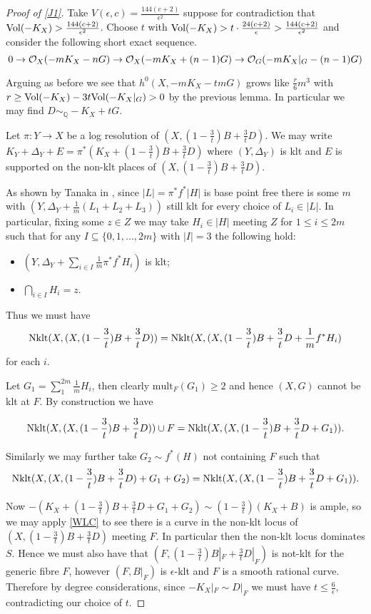 \begin{proof}[Proof of \autoref{J1}]
	
	Take $V(\epsilon,c)=\frac{144(c+2)}{\epsilon^{2}}$ suppose for contradiction that $ \text{Vol}(-K_{X}) > \frac{144(c+2)}{\epsilon^{2}}$. Choose $t$ with $\text{Vol}(-K_{X})> t\cdot\frac{24(c+2)}{\epsilon} > \frac{144(c+2)}{\epsilon^{2}}$ and consider the following short exact sequence.
	\[0 \to \mathcal{O}_{X}(-mK_{X}-nG)\to \mathcal{O}_{X}(-mK_{X}+(n-1)G)\to \mathcal{O}_{G}(-mK_{X}|_{G}-(n-1)G)\]
	
	Arguing as before we see that $h^{0}(X,-mK_{X}-tmG)$ grows like $\frac{r}{6}m^{3}$ with $r\geq \text{Vol}(-K_{X})-3t\text{Vol}(-K_{X}|_{G}) >0$ by the previous lemma. In particular we may find $D \sim_{\mathbb{Q}} -K_{X}+tG$.
	
	Let $\pi\colon Y \to X$ be a log resolution of $(X, (1-\frac{3}{t})B+\frac{3}{t}D)$. We may write $K_{Y}+\Delta_{Y}+E=\pi^{*}(K_{X}+(1-\frac{3}{t})B+\frac{3}{t}D)$ where $(Y,\Delta_{Y})$ is klt and $E$ is supported on the non-klt places of $(X, (1-\frac{3}{t})B+\frac{3}{t}D)$. 
	
	As shown by Tanaka in \cite[Theorem 1]{tanaka2017semiample}, since $|L|=\pi^{*}f^{*}|H|$ is base point free there is some $m$ with $(Y,\Delta_{Y}+\frac{1}{m}(L_{1}+L_{2}+L_{3}))$	 still klt for every choice of $L_{i} \in |L|$. In particular, fixing some $z\in Z$ we may take $H_{i} \in |H|$ meeting $Z$ for $1\leq  i \leq 2m$ such that for any $I \subseteq \{0,1,...,2m\}$ with $|I| =3$ the following hold:
	
	\begin{itemize}
		\item $(Y,\Delta_{Y}+\sum_{i \in I}\frac{1}{m}\pi^{*}f^{*}H_{i})$ is klt;
		\item $\bigcap_{i\in I} H_{i}={z}$.
	\end{itemize} 
	
	Thus we must have 
	\[\textup{Nklt}(X, (X, (1-\frac{3}{t})B+\frac{3}{t}D))=\textup{Nklt}(X, (X, (1-\frac{3}{t})B+\frac{3}{t}D+\frac{1}{m}f^{*}H_{i})\]
	for each $i$. 
	
	Let $G_{1} = \sum_{1}^{2m} \frac{1}{m}H_{i}$, then clearly $\text{mult}_{F}(G_{1}) \geq 2$ and hence $(X,G)$ cannot be klt at $F$. By construction we have
	
	\[\textup{Nklt}(X, (X, (1-\frac{3}{t})B+\frac{3}{t}D)) \cup F = \textup{Nklt}(X, (X, (1-\frac{3}{t})B+\frac{3}{t}D+G_{1})).\]
	
	Similarly we may further take $G_{2} \sim f^{*}(H)$ not containing $F$ such that
	\[\textup{Nklt}(X, (X, (1-\frac{3}{t})B+\frac{3}{t}D)+G_{1}+G_{2}) = \textup{Nklt}(X, (X, (1-\frac{3}{t})B+\frac{3}{t}D+G_{1})).\]
	
	Now $-(K_{X}+(1-\frac{3}{t})B+\frac{3}{t}D+G_{1}+G_{2}) \sim (1-\frac{3}{t})(K_{X}+B)$ is ample, so we may apply \autoref{WLC} to see there is a curve in the non-klt locus of $(X,(1-\frac{3}{t})B+\frac{3}{t}D)$ meeting $F$. In particular then the non-klt locus dominates $S$. Hence we must also have that $(F,(1-\frac{3}{t})B|_{F}+\frac{3}{t}D|_{F})$ is not-klt for the generic fibre $F$, however $(F,B|_{F})$ is $\epsilon$-klt and $F$ is a smooth rational curve. Therefore by degree considerations, since $-K_{X}|_{F} \sim D|_{F}$ we must have $t \leq \frac{6}{\epsilon}$, contradicting our choice of $t$. 
\end{proof}

